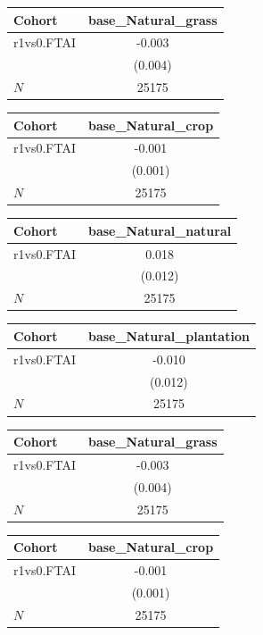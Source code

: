{
\def\sym#1{\ifmmode^{#1}\else\(^{#1}\)\fi}
\begin{tabular}{l*{1}{c}}
\toprule
Cohort    &base\_Natural\_grass   \\
\midrule
r1vs0.FTAI&   -0.003   \\
          &  (0.004)   \\
\midrule
\(N\)     &    25175   \\
\bottomrule
\end{tabular}
}
{
\def\sym#1{\ifmmode^{#1}\else\(^{#1}\)\fi}
\begin{tabular}{l*{1}{c}}
\toprule
Cohort    &base\_Natural\_crop   \\
\midrule
r1vs0.FTAI&   -0.001   \\
          &  (0.001)   \\
\midrule
\(N\)     &    25175   \\
\bottomrule
\end{tabular}
}
{
\def\sym#1{\ifmmode^{#1}\else\(^{#1}\)\fi}
\begin{tabular}{l*{1}{c}}
\toprule
Cohort    &base\_Natural\_natural   \\
\midrule
r1vs0.FTAI&    0.018   \\
          &  (0.012)   \\
\midrule
\(N\)     &    25175   \\
\bottomrule
\end{tabular}
}
{
\def\sym#1{\ifmmode^{#1}\else\(^{#1}\)\fi}
\begin{tabular}{l*{1}{c}}
\toprule
Cohort    &base\_Natural\_plantation   \\
\midrule
r1vs0.FTAI&   -0.010   \\
          &  (0.012)   \\
\midrule
\(N\)     &    25175   \\
\bottomrule
\end{tabular}
}
{
\def\sym#1{\ifmmode^{#1}\else\(^{#1}\)\fi}
\begin{tabular}{l*{1}{c}}
\toprule
Cohort    &base\_Natural\_grass   \\
\midrule
r1vs0.FTAI&   -0.003   \\
          &  (0.004)   \\
\midrule
\(N\)     &    25175   \\
\bottomrule
\end{tabular}
}
{
\def\sym#1{\ifmmode^{#1}\else\(^{#1}\)\fi}
\begin{tabular}{l*{1}{c}}
\toprule
Cohort    &base\_Natural\_crop   \\
\midrule
r1vs0.FTAI&   -0.001   \\
          &  (0.001)   \\
\midrule
\(N\)     &    25175   \\
\bottomrule
\end{tabular}
}
